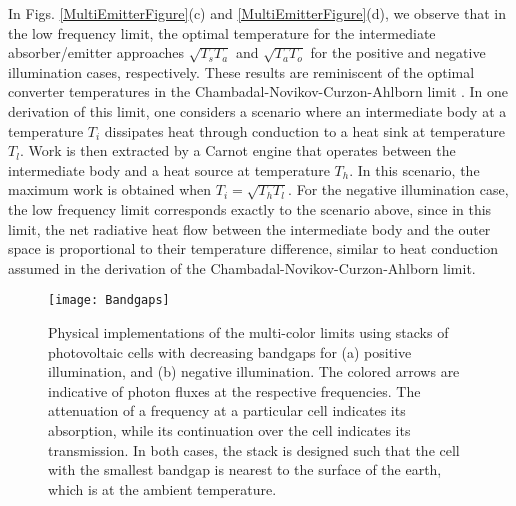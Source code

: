 \documentclass[notitlepage,onecolumn,aps,showpacs,preprintnumbers,amsmath,amssymb,superscriptaddress]{revtex4-1}
\begin{document}
In Figs. \ref{MultiEmitterFigure}(c) and \ref{MultiEmitterFigure}(d), we observe that in the low frequency limit, the optimal temperature for the intermediate absorber/emitter approaches $\sqrt{T_sT_a}$ and $\sqrt{T_aT_o}$ for the positive and negative illumination cases, respectively. These results are reminiscent of the optimal converter temperatures in the Chambadal-Novikov-Curzon-Ahlborn limit \citep{novikov, chambadal, curzonahlborn}. In one derivation of this limit, one considers a scenario where an intermediate body at a temperature $T_i$ dissipates heat through conduction to a heat sink at temperature $T_l$. Work is then extracted by a Carnot engine that operates between the intermediate body and a heat source at temperature $T_h$. In this scenario, the maximum work is obtained when $T_i = \sqrt{T_hT_l}$. For the negative illumination case, the low frequency limit corresponds exactly to the scenario above, since in this limit, the net radiative heat flow between the intermediate body and the outer space is proportional to their temperature difference, similar to heat conduction assumed in the derivation of the Chambadal-Novikov-Curzon-Ahlborn limit. \\
\begin{figure}
\centering
\texttt{[image: Bandgaps]}
\caption{Physical implementations of the multi-color limits using stacks of photovoltaic cells with decreasing bandgaps for (a) positive illumination, and (b) negative illumination. The colored arrows are indicative of photon fluxes at the respective frequencies. The attenuation of a frequency at a particular cell indicates its absorption, while its continuation over the cell indicates its transmission. In both cases, the stack is designed such that the cell with the smallest bandgap is nearest to the surface of the earth, which is at the ambient temperature.}
\label{Bandgaps}
\end{figure}

\end{document}
